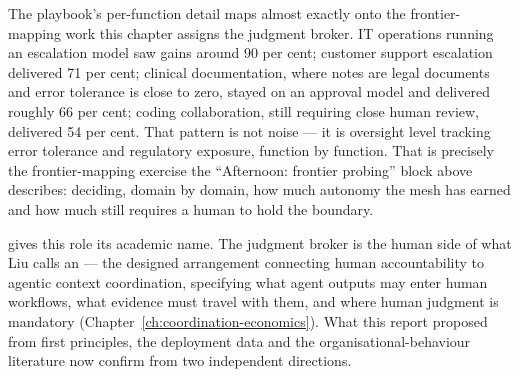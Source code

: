 The playbook's per-function detail maps almost exactly onto the frontier-mapping work this chapter assigns the judgment broker. IT operations running an escalation model saw gains around 90 per cent; customer support escalation delivered 71 per cent; clinical documentation, where notes are legal documents and error tolerance is close to zero, stayed on an approval model and delivered roughly 66 per cent; coding collaboration, still requiring close human review, delivered 54 per cent. That pattern is not noise --- it is oversight level tracking error tolerance and regulatory exposure, function by function. That is precisely the frontier-mapping exercise the ``Afternoon: frontier probing'' block above describes: deciding, domain by domain, how much autonomy the mesh has earned and how much still requires a human to hold the boundary.

\textcite{Liu2026} gives this role its academic name. The judgment broker is the human side of what Liu calls an  --- the designed arrangement connecting human accountability to agentic context coordination, specifying what agent outputs may enter human workflows, what evidence must travel with them, and where human judgment is mandatory (Chapter~\ref{ch:coordination-economics}). What this report proposed from first principles, the deployment data and the organisational-behaviour literature now confirm from two independent directions.
